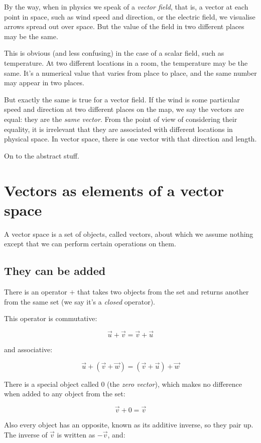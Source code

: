 By the way, when in physics we speak of a \textit{vector field}, that is, a vector at each point in space, such as wind speed and direction, or the electric field, we visualise arrows spread out over space. But the value of the field in two different places may be the same.

This is obvious (and less confusing) in the case of a scalar field, such as temperature. At two different locations in a room, the temperature may be the same. It's a numerical value that varies from place to place, and the same number may appear in two places.

But exactly the same is true for a vector field. If the wind is some particular speed and direction at two different places on the map, we say the vectors are equal: they are the \textit{same vector}. From the point of view of considering their equality, it is irrelevant that they are associated with different locations in physical space. In vector space, there is one vector with that direction and length.

On to the abstract stuff.

\section{Vectors as elements of a vector space}\label{sec:vectors-space}

A vector space is a set of objects, called vectors, about which we assume nothing except that we can perform certain operations on them.

\subsection{They can be added}

There is an operator $+$ that takes two objects from the set and returns another from the same set (we say it's a \textit{closed} operator).

This operator is commutative:

$$\vec{u} + \vec{v} = \vec{v} + \vec{u}$$

and associative:

$$\vec{u} + (\vec{v} + \vec{w}) = (\vec{v} + \vec{u}) + \vec{w}$$

There is a special object called $0$ (the \textit{zero vector}), which makes no difference when added to any object from the set:

$$\vec{v} + 0 = \vec{v}$$

Also every object has an opposite, known as its additive inverse, so they pair up. The inverse of $\vec{v}$ is written as $-\vec{v}$, and:

